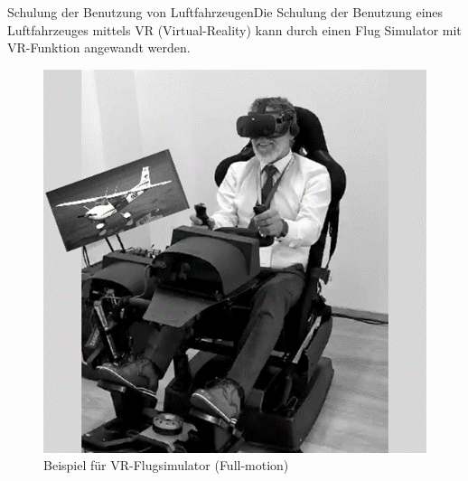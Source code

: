 Schulung der Benutzung von LuftfahrzeugenDie Schulung der Benutzung eines Luftfahrzeuges mittels VR (Virtual-Reality) kann durch einen Flug Simulator mit VR-Funktion angewandt werden.
\\
\begin{figure}[!ht]
    \centering
    \includegraphics[width=1.0\textwidth]{images/Abbildung 1.png}
    \caption{\label{fig:Abbildung 1}Beispiel für VR-Flugsimulator (Full-motion)\protect
    }
\end{figure}

